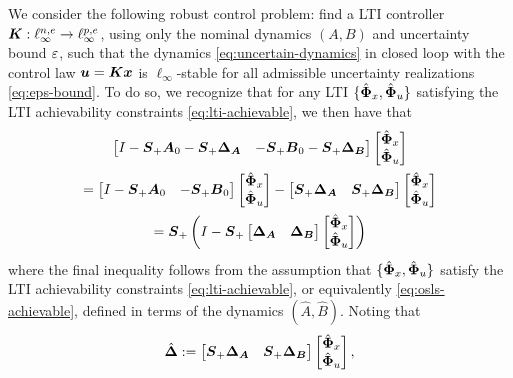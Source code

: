 We consider the following robust control problem: find a LTI controller $\tf K : \ell_\infty^{n,e} \to \ell_\infty^{p,e}$, using only the nominal dynamics $(A,B)$ and uncertainty bound $\eps$, such that the dynamics \eqref{eq:uncertain-dynamics} in closed loop with the control law $\uu = \K \x$ is $\ell_\infty$-stable for all admissible uncertainty realizations \eqref{eq:eps-bound}.  To do so, we recognize that for any LTI $\{\Phixh,\Phiuh\}$ satisfying the LTI achievability constraints \eqref{eq:lti-achievable}, we then have that
\begin{multline}
\begin{bmatrix} I - \Sp\A_0 - \Sp\DA & - \Sp\B_0 - \Sp\DB \end{bmatrix}\begin{bmatrix} \Phixh \\ \Phiuh \end{bmatrix} \\= \begin{bmatrix} I - \Sp\A_0 & - \Sp\B_0 \end{bmatrix}\begin{bmatrix} \Phixh \\ \Phiuh \end{bmatrix} - \begin{bmatrix} \Sp\DA & \Sp\DB \end{bmatrix}\begin{bmatrix} \Phixh \\ \Phiuh \end{bmatrix}\\ = \Sp\left(I - \Sp\begin{bmatrix} \DA & \DB \end{bmatrix}\begin{bmatrix} \Phixh \\ \Phiuh \end{bmatrix} \right)
\end{multline}
where the final inequality follows from the assumption that $\{\Phixh,\Phiuh\}$ satisfy the LTI achievability constraints \eqref{eq:lti-achievable}, or equivalently \eqref{eq:osls-achievable}, defined in terms of the dynamics $(\hat A, \hat B)$.  Noting that
\begin{equation}
\Dh := \begin{bmatrix} \Sp\DA & \Sp\DB \end{bmatrix}\begin{bmatrix} \Phixh \\ \Phiuh \end{bmatrix},
\end{equation}

